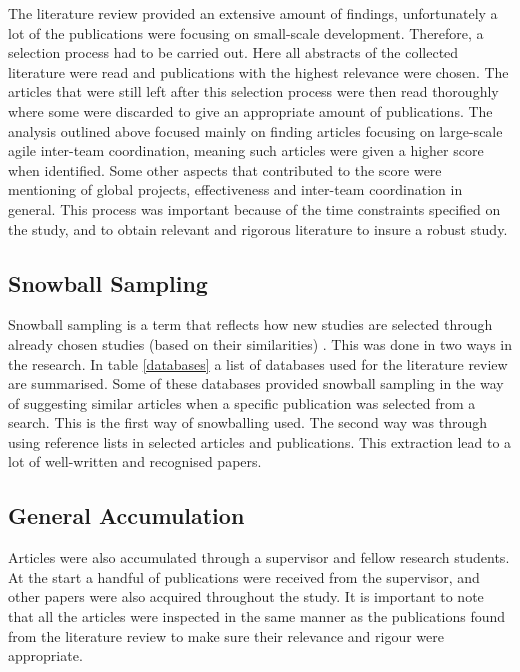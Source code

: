 The literature review provided an extensive amount of findings, unfortunately a lot of the publications were focusing on small-scale development. Therefore, a selection process had to be carried out. Here all abstracts of the collected literature were read and publications with the highest relevance were chosen. The articles that were still left after this selection process were then read thoroughly where some were discarded to give an appropriate amount of publications. The analysis outlined above focused mainly on finding articles focusing on large-scale agile inter-team coordination, meaning such articles were given a higher score when identified. Some other aspects that contributed to the score were mentioning of global projects, effectiveness and inter-team coordination in general. This process was important because of the time constraints specified on the study, and to obtain relevant and rigorous literature to insure a robust study.

\subsection{Snowball Sampling}

Snowball sampling is a term that reflects how new studies are selected through already chosen studies (based on their similarities) \cite{Goodman1961}. This was done in two ways in the research. In table \ref{databases} a list of databases used for the literature review are summarised. Some of these databases provided snowball sampling in the way of suggesting similar articles when a specific publication was selected from a search. This is the first way of snowballing used. The second way was through using reference lists in selected articles and publications. This extraction lead to a lot of well-written and recognised papers.

\subsection{General Accumulation}
\label{general}

Articles were also accumulated through a supervisor and fellow research students. At the start a handful of publications were received from the supervisor, and other papers were also acquired throughout the study. It is important to note that all the articles were inspected in the same manner as the publications found from the literature review to make sure their relevance and rigour were appropriate.

